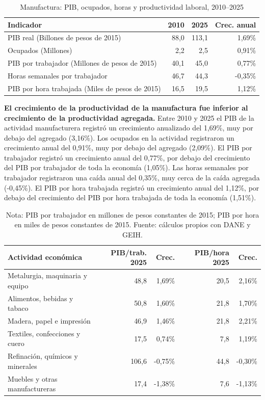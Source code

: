 \begin{table}[H]
\centering
\caption{Manufactura: PIB, ocupados, horas y productividad laboral, 2010--2025}
\label{tab:sector_c_productividad}
\small
\begin{tabular}{lrrr}
\toprule
Indicador & 2010 & 2025 & Crec. anual \\
\midrule
PIB real  (Billones de pesos de 2015) & 88,0 & 113,1 & 1,69\% \\
Ocupados (Millones) & 2,2 & 2,5 & 0,91\% \\
PIB por trabajador (Millones de pesos de 2015) & 40,1 & 45,0 & 0,77\% \\
Horas semanales por trabajador & 46,7 & 44,3 & -0,35\% \\
PIB por hora trabajada (Miles de pesos de 2015) & 16,5 & 19,5 & 1,12\% \\
\bottomrule
\end{tabular}
\end{table}

\textbf{El crecimiento de la productividad de la manufactura fue inferior al crecimiento de la productividad agregada.} Entre 2010 y 2025 el PIB de la actividad manufacturera registró un crecimiento anualizado del 1,69\%, muy por debajo del agregado (3,16\%). Los ocupados en la actividad registraron un crecimiento anual del 0,91\%, muy por debajo del agregado (2,09\%). El PIB por trabajador registró un crecimiento anual del 0,77\%, por debajo del crecimiento del PIB por trabajador de toda la economía (1,05\%). Las horas semanales por trabajador registraron una caída anual del 0,35\%, muy cerca de la caída agregada (-0,45\%). El PIB por hora trabajada registró un crecimiento anual del 1,12\%, por debajo del crecimiento del PIB por hora trabajada de toda la economía (1,51\%).

\begin{table}[H]
\centering
\caption{Productividad laboral de las actividades manufactureras, 2010--2025}
\label{tab:sector_c_zoom25}
\small
\begin{tabular}{p{}rrrr}
\toprule
Actividad económica & PIB/trab. 2025 & Crec. & PIB/hora 2025 & Crec. \\
\midrule
Metalurgia, maquinaria y equipo & 48,8 & 1,69\% & 20,5 & 2,16\% \\
Alimentos, bebidas y tabaco & 50,8 & 1,60\% & 21,8 & 1,70\% \\
Madera, papel e impresión & 46,9 & 1,46\% & 21,8 & 2,21\% \\
Textiles, confecciones y cuero & 17,5 & 0,74\% & 7,8 & 1,19\% \\
Refinación, químicos y minerales & 106,6 & -0,75\% & 44,8 & -0,30\% \\
Muebles y otras manufactureras & 17,4 & -1,38\% & 7,6 & -1,13\% \\
\bottomrule
\end{tabular}
\caption*{\footnotesize Nota: PIB por trabajador en millones de pesos constantes de 2015; PIB por hora en miles de pesos constantes de 2015. Fuente: cálculos propios con DANE y GEIH.}
\end{table}

